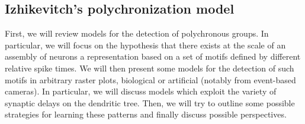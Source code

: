 \documentclass[brainsci, %
               review,submit,pdftex,moreauthors%
               ]{Definitions/mdpi}
\begin{document}
\subsection{Izhikevitch's polychronization model}
First, we will review models for the detection of polychronous groups.
In particular, we will focus on the hypothesis that there exists at the scale of an assembly of neurons a representation based on a set of motifs defined by different relative spike times. %
We will then present some models for the detection of such motifs in arbitrary raster plots, biological or artificial (notably from event-based cameras). In particular, we will discuss models which exploit the variety of synaptic delays on the dendritic tree. Then, we will try to outline some possible strategies for learning these patterns and finally discuss possible perspectives.
%
\end{document}

